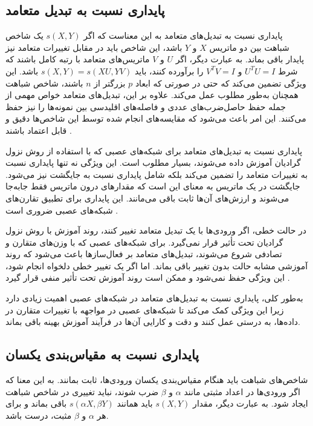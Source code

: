 \subsection{پایداری نسبت به تبدیل متعامد}

پایداری نسبت به تبدیل‌های متعامد به این معناست که اگر \( s(X, Y) \) یک شاخص شباهت بین دو ماتریس \( X \) و \( Y \) باشد، این شاخص باید در مقابل تغییرات متعامد نیز پایدار باقی بماند. به عبارت دیگر، اگر \( U \) و \( V \) ماتریس‌های متعامد با رتبه کامل%
باشند که شرط \( U^TU = I \) و \( V^TV = I \) را برآورده کنند، باید \( s(X, Y) = s(XU, YV) \) باشد. این ویژگی تضمین می‌کند که حتی در صورتی که ابعاد \( p \) بزرگتر از \( n \) باشند، شاخص شباهت همچنان به‌طور مطلوب عمل می‌کند. علاوه بر این، تبدیل‌های متعامد خواص مهمی از جمله حفظ حاصل‌ضرب‌های عددی و فاصله‌های اقلیدسی%
بین نمونه‌ها را نیز حفظ می‌کنند. این امر باعث می‌شود که مقایسه‌های انجام شده توسط این شاخص‌ها دقیق و قابل اعتماد باشند
\cite{kornblith2019similarity}.

پایداری نسبت به تبدیل‌های متعامد برای شبکه‌های عصبی که با استفاده از روش نزول گرادیان آموزش داده می‌شوند، بسیار مطلوب است. این ویژگی نه تنها پایداری نسبت به تغییرات متعامد را تضمین می‌کند بلکه شامل پایداری نسبت به جایگشت نیز می‌شود. جایگشت در یک ماتریس به معنای این است که مقدارهای درون ماتریس فقط جابه‌جا می‌شوند و ارزش‌های آن‌ها ثابت باقی می‌مانند. این پایداری برای تطبیق تقارن‌های شبکه‌های عصبی ضروری است
\cite{chen1993geometry, orhan2017skip}.

در حالت خطی، اگر ورودی‌ها با یک تبدیل متعامد تغییر کنند، روند آموزش با روش نزول گرادیان تحت تأثیر قرار نمی‌گیرد. برای شبکه‌های عصبی که با وزن‌های متقارن و تصادفی شروع می‌شوند، تبدیل‌های متعامد بر فعال‌سازها باعث می‌شود که روند آموزشی مشابه حالت بدون تغییر باقی بماند. اما اگر یک تغییر خطی دلخواه انجام شود، این ویژگی حفظ نمی‌شود و ممکن است روند آموزش تحت تأثیر منفی قرار گیرد
\cite{lecun1990second}.

به‌طور کلی، پایداری نسبت به تبدیل‌های متعامد در شبکه‌های عصبی اهمیت زیادی دارد زیرا این ویژگی کمک می‌کند تا شبکه‌های عصبی در مواجهه با تغییرات متقارن در داده‌ها، به درستی عمل کنند و دقت و کارایی آن‌ها در فرآیند آموزش بهینه باقی بماند.



\subsection{پایداری نسبت به مقیاس‌بندی یکسان}

شاخص‌های شباهت باید هنگام مقیاس‌بندی یکسان ورودی‌ها، ثابت بمانند. به این معنا که اگر ورودی‌ها در اعداد مثبتی مانند \(\alpha\) و \(\beta\) ضرب شوند، نباید تغییری در شاخص شباهت ایجاد شود. به عبارت دیگر، مقدار \( s(X, Y) \) باید همانند \( s(\alpha X, \beta Y) \) باقی بماند و برای هر \(\alpha\) و \(\beta\) مثبت، درست باشد.

